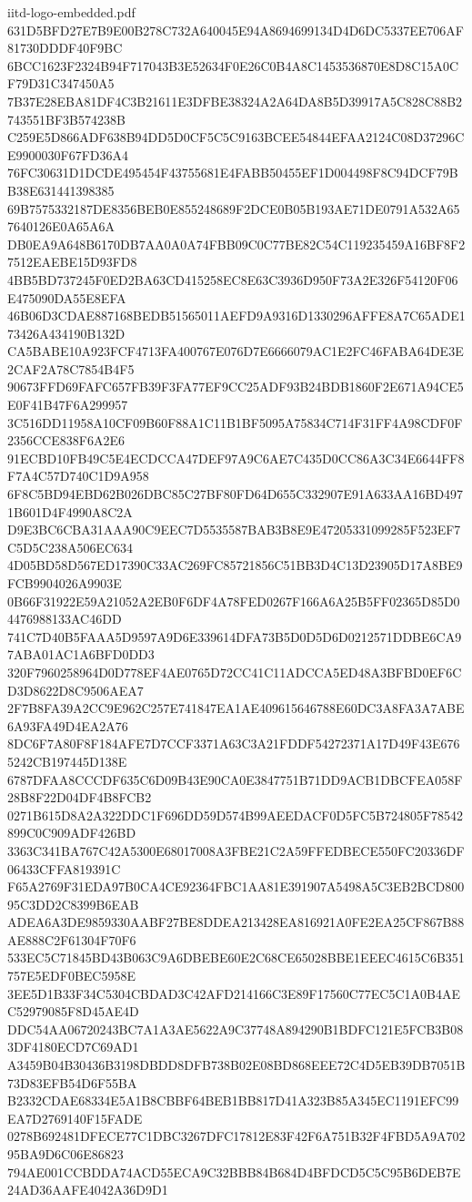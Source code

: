 \begin{filecontents*}[overwrite]{iitd-logo-embedded.pdf}
631D5BFD27E7B9E00B278C732A640045E94A8694699134D4D6DC5337EE706AF81730DDDF40F9BC
6BCC1623F2324B94F717043B3E52634F0E26C0B4A8C1453536870E8D8C15A0CF79D31C347450A5
7B37E28EBA81DF4C3B21611E3DFBE38324A2A64DA8B5D39917A5C828C88B2743551BF3B574238B
C259E5D866ADF638B94DD5D0CF5C5C9163BCEE54844EFAA2124C08D37296CE9900030F67FD36A4
76FC30631D1DCDE495454F43755681E4FABB50455EF1D004498F8C94DCF79BB38E631441398385
69B7575332187DE8356BEB0E855248689F2DCE0B05B193AE71DE0791A532A657640126E0A65A6A
DB0EA9A648B6170DB7AA0A0A74FBB09C0C77BE82C54C119235459A16BF8F27512EAEBE15D93FD8
4BB5BD737245F0ED2BA63CD415258EC8E63C3936D950F73A2E326F54120F06E475090DA55E8EFA
46B06D3CDAE887168BEDB51565011AEFD9A9316D1330296AFFE8A7C65ADE173426A434190B132D
CA5BABE10A923FCF4713FA400767E076D7E6666079AC1E2FC46FABA64DE3E2CAF2A78C7854B4F5
90673FFD69FAFC657FB39F3FA77EF9CC25ADF93B24BDB1860F2E671A94CE5E0F41B47F6A299957
3C516DD11958A10CF09B60F88A1C11B1BF5095A75834C714F31FF4A98CDF0F2356CCE838F6A2E6
91ECBD10FB49C5E4ECDCCA47DEF97A9C6AE7C435D0CC86A3C34E6644FF8F7A4C57D740C1D9A958
6F8C5BD94EBD62B026DBC85C27BF80FD64D655C332907E91A633AA16BD4971B601D4F4990A8C2A
D9E3BC6CBA31AAA90C9EEC7D5535587BAB3B8E9E47205331099285F523EF7C5D5C238A506EC634
4D05BD58D567ED17390C33AC269FC85721856C51BB3D4C13D23905D17A8BE9FCB9904026A9903E
0B66F31922E59A21052A2EB0F6DF4A78FED0267F166A6A25B5FF02365D85D04476988133AC46DD
741C7D40B5FAAA5D9597A9D6E339614DFA73B5D0D5D6D0212571DDBE6CA97ABA01AC1A6BFD0DD3
320F7960258964D0D778EF4AE0765D72CC41C11ADCCA5ED48A3BFBD0EF6CD3D8622D8C9506AEA7
2F7B8FA39A2CC9E962C257E741847EA1AE409615646788E60DC3A8FA3A7ABE6A93FA49D4EA2A76
8DC6F7A80F8F184AFE7D7CCF3371A63C3A21FDDF54272371A17D49F43E6765242CB197445D138E
6787DFAA8CCCDF635C6D09B43E90CA0E3847751B71DD9ACB1DBCFEA058F28B8F22D04DF4B8FCB2
0271B615D8A2A322DDC1F696DD59D574B99AEEDACF0D5FC5B724805F78542899C0C909ADF426BD
3363C341BA767C42A5300E68017008A3FBE21C2A59FFEDBECE550FC20336DF06433CFFA819391C
F65A2769F31EDA97B0CA4CE92364FBC1AA81E391907A5498A5C3EB2BCD80095C3DD2C8399B6EAB
ADEA6A3DE9859330AABF27BE8DDEA213428EA816921A0FE2EA25CF867B88AE888C2F61304F70F6
533EC5C71845BD43B063C9A6DBEBE60E2C68CE65028BBE1EEEC4615C6B351757E5EDF0BEC5958E
3EE5D1B33F34C5304CBDAD3C42AFD214166C3E89F17560C77EC5C1A0B4AEC52979085F8D45AE4D
DDC54AA06720243BC7A1A3AE5622A9C37748A894290B1BDFC121E5FCB3B083DF4180ECD7C69AD1
A3459B04B30436B3198DBDD8DFB738B02E08BD868EEE72C4D5EB39DB7051B73D83EFB54D6F55BA
B2332CDAE68334E5A1B8CBBF64BEB1BB817D41A323B85A345EC1191EFC99EA7D2769140F15FADE
0278B692481DFECE77C1DBC3267DFC17812E83F42F6A751B32F4FBD5A9A70295BA9D6C06E86823
794AE001CCBDDA74ACD55ECA9C32BBB84B684D4BFDCD5C5C95B6DEB7E24AD36AAFE4042A36D9D1

\end{filecontents*}
